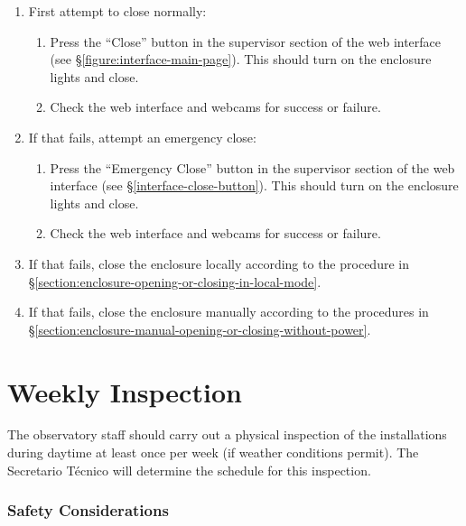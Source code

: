 \begin{enumerate}
\item
First attempt to close normally:
\begin{enumerate}
\item
Press the “Close” button in the supervisor section of the web interface (see \S\ref{figure:interface-main-page}). This should turn on the enclosure lights and close.
\item
Check the web interface and webcams for success or failure.
\end{enumerate}
\item
If that fails, attempt an emergency close:
\begin{enumerate}
\item
Press the “Emergency Close” button in the supervisor section of the web interface (see \S\ref{interface-close-button}). This should turn on the enclosure lights and close.
\item
Check the web interface and webcams for success or failure.
\end{enumerate}
\item
If that fails, close the enclosure locally according to the procedure in \S\ref{section:enclosure-opening-or-closing-in-local-mode}.
\item
If that fails, close the enclosure manually according to the procedures in %
\S\ref{section:enclosure-manual-opening-or-closing-without-power}.
\end{enumerate}

\section{Weekly Inspection}

The observatory staff should carry out a physical inspection of the installations during daytime at least once per week (if weather conditions permit). The Secretario Técnico will determine the schedule for this inspection.

\subsubsection{Safety Considerations}



